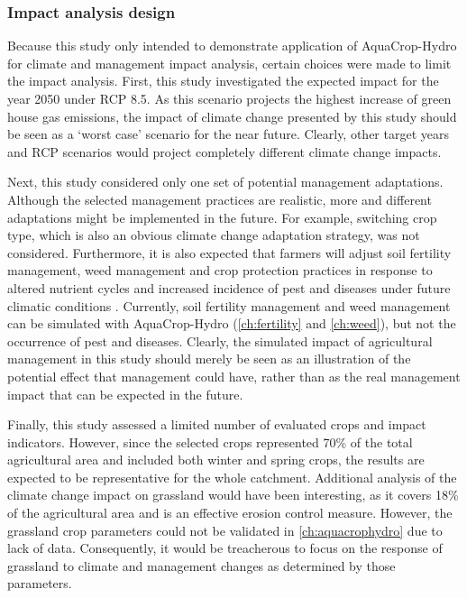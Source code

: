 \subsubsection{Impact analysis design}
Because this study only intended to demonstrate application of AquaCrop-Hydro for climate and management impact analysis, certain choices were made to limit the impact analysis.
First, this study investigated the expected impact for the year 2050 under RCP 8.5. As this scenario projects the highest increase of green house gas emissions, the impact of climate change presented by this study should be seen as a `worst case' scenario for the near future. Clearly, other target years and RCP scenarios would project completely different climate change impacts.

Next, this study considered only one set of potential management adaptations. Although the selected management practices are realistic, more and different adaptations might be implemented in the future. For example, switching crop type, which is also an obvious climate change adaptation strategy, was not considered. Furthermore, it is also expected that farmers will adjust soil fertility management, weed management and crop protection practices in response to altered nutrient cycles and increased incidence of pest and diseases under future climatic conditions \parencite{olesen2011}. Currently, soil fertility management and weed management can be simulated with AquaCrop-Hydro (\autoref{ch:fertility} and \autoref{ch:weed}), but not the occurrence of pest and diseases. Clearly, the simulated impact of agricultural management in this study should merely be seen as an illustration of the potential effect that management could have, rather than as the real management impact that can be expected in the future. 

Finally, this study assessed a limited number of evaluated crops and impact indicators. However, since the selected crops represented 70\% of the total agricultural area and included both winter and spring crops, the results are expected to be representative for the whole catchment. Additional analysis of the climate change impact on grassland would have been interesting, as it covers 18\% of the agricultural area and is an effective erosion control measure. However, the grassland crop parameters could not be validated in \autoref{ch:aquacrophydro} due to lack of data. Consequently, it would be treacherous to focus on the response of grassland to climate and management changes as determined by those parameters.  

